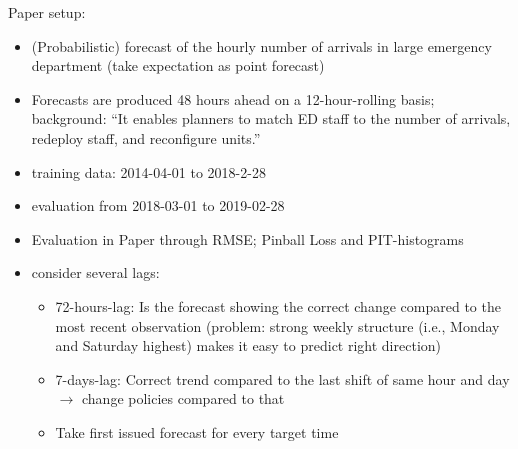 \textcite{Rostami-Tabar2023}

Paper setup:

\begin{itemize}
    \item (Probabilistic) forecast of the hourly number of arrivals in large emergency department (take expectation as point forecast)
    \item Forecasts are produced 48 hours ahead on a 12-hour-rolling basis; background: \enquote{It enables planners to match ED staff to the number of arrivals, redeploy staff, and reconfigure units.}
    \item training data: 2014-04-01 to 2018-2-28
    \item evaluation from 2018-03-01 to 2019-02-28
    \item Evaluation in Paper through RMSE; Pinball Loss and PIT-histograms
    \item consider several lags:
    \begin{itemize}
        \item 72-hours-lag: Is the forecast showing the correct change compared to the most recent observation (problem: strong weekly structure (i.e., Monday and Saturday highest) makes it easy to predict right direction)
        \item 7-days-lag: Correct trend compared to the last shift of same hour and day $\rightarrow$ change policies compared to that
        \item Take first issued forecast for every target time
    \end{itemize}
\end{itemize}